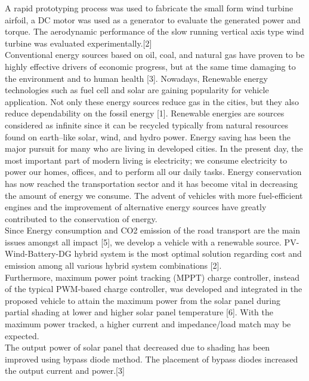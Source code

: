 \documentclass[a4paper,12pt]{article}
\begin{document}
A rapid prototyping process was used to fabricate
the small form wind turbine airfoil, a DC motor
was used as a generator to evaluate the generated
power and torque. The aerodynamic performance
of the slow running vertical axis type wind
turbine was evaluated experimentally.[2]\\

Conventional energy sources based on oil, coal, and natural gas have proven to be highly effective drivers of economic progress, but at the same time damaging to the environment and to human health [3]. Nowadays, Renewable energy technologies such as fuel cell and solar are gaining popularity for vehicle application. Not only these energy sources reduce gas in the cities, but they also reduce dependability on the fossil energy [1]. Renewable energies are sources considered as infinite since it can be recycled typically from natural resources found on earth–like solar, wind, and hydro power. Energy saving has been the major pursuit for many who are living in developed cities. In the present day, the most important part of modern living is electricity; we consume electricity to power our homes, offices, and to perform all our daily tasks. Energy conservation has now reached the transportation sector and it has become vital in decreasing the amount of energy we consume. The advent of vehicles with more fuel-efficient engines and the improvement of alternative energy sources have greatly contributed to the conservation of energy.\\

Since Energy consumption and CO2 emission of the road transport are the main issues amongst all impact [5], we develop a vehicle with a renewable source. PV-Wind-Battery-DG hybrid system is the most optimal solution regarding cost and emission among all various hybrid system combinations [2].\\

Furthermore, maximum power point tracking (MPPT) charge controller, instead of the typical PWM-based charge controller, was developed and integrated in the proposed vehicle to attain the maximum power from the solar panel during partial shading at lower and higher solar panel temperature [6]. With the maximum power tracked, a higher current and impedance/load match may be expected.\\

The output power of solar panel that decreased
due to shading has been improved using
bypass diode method. The placement of bypass
diodes increased the output current and power.[3]\\
\end{document}

